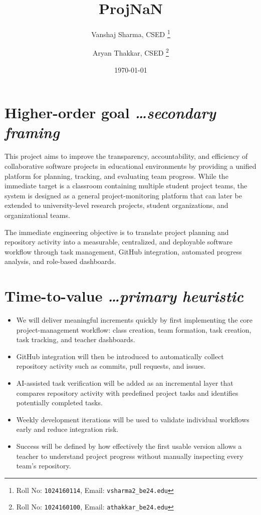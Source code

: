 \documentclass[11pt,a4paper]{article}
\title{ProjNaN}
\author{
  Vanshaj Sharma, CSED%
  \thanks{
    Roll No: \texttt{1024160114},
    Email: \texttt{vsharma2\_be24\@thapar.edu}
  }
  \and
  Aryan Thakkar, CSED%
  \thanks{
    Roll No: \texttt{1024160100},
    Email: \texttt{athakkar\_be24\@thapar.edu}
  }
}
\date{\today}
\newcommand{\BvrHint}[1]{%
  \texorpdfstring{%
    {\normalfont\normalsize\itshape\hfill #1}%
  }{}%
}
\begin{document}
\maketitle


\section{Higher-order goal%
  \BvrHint{\ldots secondary framing}}

This project aims to improve the transparency, accountability, and efficiency of collaborative software projects in educational environments by providing a unified platform for planning, tracking, and evaluating team progress. While the immediate target is a classroom containing multiple student project teams, the system is designed as a general project-monitoring platform that can later be extended to university-level research projects, student organizations, and organizational teams.

The immediate engineering objective is to translate project planning and repository activity into a measurable, centralized, and deployable software workflow through task management, GitHub integration, automated progress analysis, and role-based dashboards.


\section{Time-to-value%
  \BvrHint{\ldots primary heuristic}}

\begin{itemize}[leftmargin=0.7cm]

    \item We will deliver meaningful increments quickly by first implementing the core project-management workflow: class creation, team formation, task creation, task tracking, and teacher dashboards.

    \item GitHub integration will then be introduced to automatically collect repository activity such as commits, pull requests, and issues.

    \item AI-assisted task verification will be added as an incremental layer that compares repository activity with predefined project tasks and identifies potentially completed tasks.

    \item Weekly development iterations will be used to validate individual workflows early and reduce integration risk.

    \item Success will be defined by how effectively the first usable version allows a teacher to understand project progress without manually inspecting every team's repository.

\end{itemize}
\end{document}

